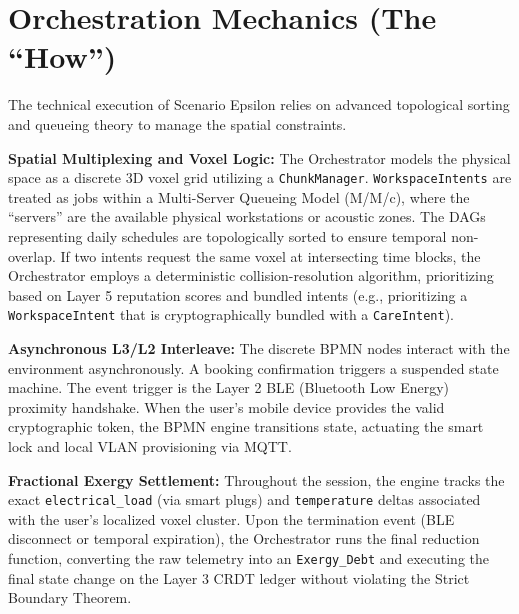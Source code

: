 \section{Orchestration Mechanics (The ``How'')}
The technical execution of Scenario Epsilon relies on advanced topological sorting and queueing theory to manage the spatial constraints.

\textbf{Spatial Multiplexing and Voxel Logic:} The Orchestrator models the physical space as a discrete 3D voxel grid utilizing a \texttt{ChunkManager}. \texttt{WorkspaceIntents} are treated as jobs within a Multi-Server Queueing Model (M/M/c), where the ``servers'' are the available physical workstations or acoustic zones. The DAGs representing daily schedules are topologically sorted to ensure temporal non-overlap. If two intents request the same voxel at intersecting time blocks, the Orchestrator employs a deterministic collision-resolution algorithm, prioritizing based on Layer 5 reputation scores and bundled intents (e.g., prioritizing a \texttt{WorkspaceIntent} that is cryptographically bundled with a \texttt{CareIntent}).

\textbf{Asynchronous L3/L2 Interleave:} The discrete BPMN nodes interact with the environment asynchronously. A booking confirmation triggers a suspended state machine. The event trigger is the Layer 2 BLE (Bluetooth Low Energy) proximity handshake. When the user's mobile device provides the valid cryptographic token, the BPMN engine transitions state, actuating the smart lock and local VLAN provisioning via MQTT. 

\textbf{Fractional Exergy Settlement:} Throughout the session, the engine tracks the exact \texttt{electrical\_load} (via smart plugs) and \texttt{temperature} deltas associated with the user's localized voxel cluster. Upon the termination event (BLE disconnect or temporal expiration), the Orchestrator runs the final reduction function, converting the raw telemetry into an \texttt{Exergy\_Debt} and executing the final state change on the Layer 3 CRDT ledger without violating the Strict Boundary Theorem.
